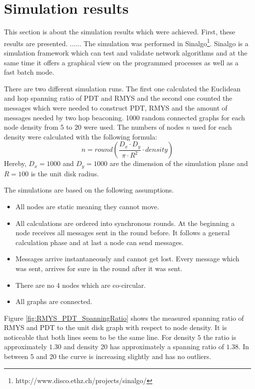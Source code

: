 \section{Simulation results}
This section is about the simulation results which were achieved.
First, these results are presented.
......
The simulation was performed in Sinalgo\footnote{http://www.disco.ethz.ch/projects/sinalgo/}.
Sinalgo is a simulation framework which can test and validate network algorithms and at the same time it offers a graphical view on the programmed processes as well as a fast batch mode.

There are two different simulation runs.
The first one calculated the Euclidean and hop spanning ratio of PDT and RMYS and the second one counted the messages which were needed to construct PDT, RMYS and the amount of messages needed by two hop beaconing.
1000 random connected graphs for each node density from 5 to 20 were used.
The numbers of nodes $n $ used for each density were calculated with the following formula:
\begin{equation*}
n =round( \frac{D_x \cdot D_y}{\pi \cdot R^2} \cdot density)
\end{equation*}
Hereby, $D_x=1000 $ and $D_y=1000 $ are the dimension of the simulation plane and $R = 100 $ is the unit disk radius.

\bigskip

The simulations are based on the following assumptions.
\begin{itemize}
\item All nodes are static meaning they cannot move.
\item All calculations are ordered into synchronous rounds. 
At the beginning a node receives all messages sent in the round before.
It follows a general calculation phase and at last a node can send messages.
\item Messages arrive instantaneously and cannot get lost.
Every message which was sent, arrives for sure in the round after it was sent.
\item There are no 4 nodes which are co-circular.
\item All graphs are connected.
\end{itemize}

Figure \ref{fig:RMYS_PDT_SpanningRatio} shows the measured spanning ratio of RMYS and PDT to the unit disk graph with respect to node density.
It is noticeable that both lines seem to be the same line.
For density $5 $ the ratio is approximately $1.30 $ and density 20 has approximately a spanning ratio of $1.38 $.
In between 5 and 20 the curve is increasing slightly and has no outliers.

